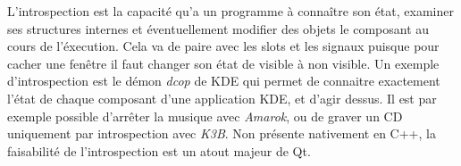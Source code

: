 L'introspection est la capacit\'e qu'a un programme à connaître son \'etat, examiner ses structures internes et \'eventuellement modifier des objets le composant au cours de l'\'execution. Cela va de paire avec les slots et les signaux puisque pour cacher une fen\^etre il faut changer son \'etat de visible \`a non visible.
Un exemple d'introspection est le démon \textit{dcop} de KDE qui permet de connaitre exactement l'état de chaque composant d'une application KDE, et d'agir dessus. Il est par exemple possible d'arrêter la musique avec \textit{Amarok}, ou de graver un CD uniquement par introspection avec \textit{K3B}.
Non présente nativement en C++, la faisabilité de l'introspection est un atout majeur de Qt.